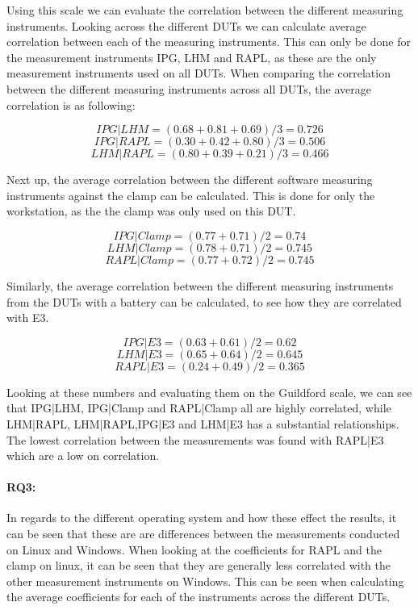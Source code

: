 Using this scale we can evaluate the correlation between the different measuring instruments. Looking across the different DUTs we can calculate average correlation between each of the measuring instruments. This can only be done for the measurement instruments IPG, LHM and RAPL, as these are the only measurement instruments used on all DUTs. When comparing the correlation between the different measuring instruments across all DUTs, the average correlation is as following:

$$IPG|LHM = (0.68+0.81+0.69)/3 = 0.726$$
$$IPG|RAPL = (0.30+0.42+0.80)/3 = 0.506$$
$$LHM|RAPL = (0.80+0.39+0.21)/3 = 0.466$$

Next up, the average correlation between the different software measuring instruments against the clamp can be calculated. This is done for only the workstation, as the the clamp was only used on this DUT.

$$IPG|Clamp = (0.77+0.71)/2 = 0.74$$
$$LHM|Clamp = (0.78+0.71)/2 = 0.745$$
$$RAPL|Clamp = (0.77+0.72)/2 = 0.745$$

Similarly, the average correlation between the different measuring instruments from the DUTs with a battery can be calculated, to see how they are correlated with E3.

$$IPG|E3 = (0.63+0.61)/2 = 0.62$$
$$LHM|E3 = (0.65+0.64)/2 = 0.645$$
$$RAPL|E3 = (0.24+0.49)/2 = 0.365$$

Looking at these numbers and evaluating them on the Guildford scale, we can see that IPG|LHM, IPG|Clamp and RAPL|Clamp all are highly correlated, while LHM|RAPL, LHM|RAPL,IPG|E3 and LHM|E3 has a substantial relationships. The lowest correlation between the measurements was found with RAPL|E3 which are a low on correlation.

\paragraph{RQ3:} In regards to the different operating system and how these effect the results, it can be seen that these are are differences between the measurements conducted on Linux and Windows. When looking at the coefficients for RAPL and the clamp on linux, it can be seen that they are generally less correlated with the other measurement instruments on Windows. This can be seen when calculating the average coefficients for each of the instruments across the different DUTs.

